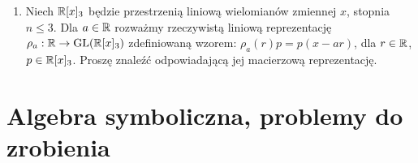 \documentclass[a4paper,11pt]{article}
\begin{document}
\begin{enumerate}
\item Niech $\mathbb{R}[ x ]_{ 3 }$ będzie przestrzenią liniową wielomianów
  zmiennej $x$, stopnia $n \leq 3$. Dla $a \in \mathbb{R}$ rozważmy rzeczywistą
  liniową reprezentację $\rho_{ a } : \mathbb{R} \to \mathrm{GL}( \mathbb{R}[ x ]_{ 3 } )$
  zdefiniowaną wzorem: $\rho_{ a }( r ) p = p ( x - ar )$, dla $r \in \mathbb{R}$,
  $p \in \mathbb{R}[ x ]_{ 3 }$. Proszę znaleźć odpowiadającą jej macierzową
  reprezentację.
































































\end{enumerate}






\section{Algebra symboliczna, problemy do zrobienia}


\end{document}
